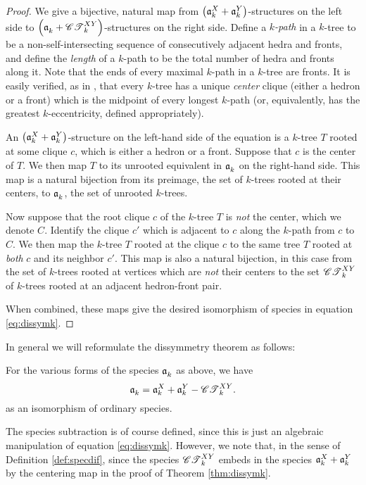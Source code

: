 \documentclass[distribution,draft]{brandiss} %
\numberwithin{section}{chapter}
\numberwithin{figure}{chapter}
\begin{document}
\begin{proof}
  We give a bijective, natural map from $\left( {\mathfrak{a}_{k}^{X} + \mathfrak{a}_{k}^{Y}} \right)$-structures on the left side to $\left( {\mathfrak{a}_{k}^{} + \mathscr{CT}_{k}^{XY}} \right)$-structures on the right side.
  Define a \emph{$k$-path} in a $k$-tree to be a non-self-intersecting sequence of consecutively adjacent hedra and fronts, and define the \emph{length} of a $k$-path to be the total number of hedra and fronts along it.
  Note that the ends of every maximal $k$-path in a $k$-tree are fronts.
  It is easily verified, as in \cite{kob:ktlogspace}, that every $k$-tree has a unique \emph{center} clique (either a hedron or a front) which is the midpoint of every longest $k$-path (or, equivalently, has the greatest $k$-eccentricity, defined appropriately).
  
  An $\left( {\mathfrak{a}_{k}^{X} + \mathfrak{a}_{k}^{Y}} \right)$-structure on the left-hand side of the equation is a $k$-tree $T$ rooted at some clique $c$, which is either a hedron or a front.
  Suppose that $c$ is the center of $T$.
  We then map $T$ to its unrooted equivalent in $\mathfrak{a}_{k}^{}$ on the right-hand side.
  This map is a natural bijection from its preimage, the set of $k$-trees rooted at their centers, to $\mathfrak{a}_{k}^{}$, the set of unrooted $k$-trees.

  Now suppose that the root clique $c$ of the $k$-tree $T$ is \emph{not} the center, which we denote $C$.
  Identify the clique $c'$ which is adjacent to $c$ along the $k$-path from $c$ to $C$.
  We then map the $k$-tree $T$ rooted at the clique $c$ to the same tree $T$ rooted at \emph{both} $c$ and its neighbor $c'$.
  This map is also a natural bijection, in this case from the set of $k$-trees rooted at vertices which are \emph{not} their centers to the set $\mathscr{CT}_{k}^{XY}$ of $k$-trees rooted at an adjacent hedron-front pair.

  When combined, these maps give the desired isomorphism of species in equation \eqref{eq:dissymk}.
\end{proof}

In general we will reformulate the dissymmetry theorem as follows:
\begin{corollary}
  \label{cor:dissymkreform}
  For the various forms of the species $\mathfrak{a}_{k}^{}$ as above, we have
  \begin{equation}
    \label{eq:dissymkreform}
    \mathfrak{a}_{k}^{} = \mathfrak{a}_{k}^{X} + \mathfrak{a}_{k}^{Y} - \mathscr{CT}_{k}^{XY}.
  \end{equation}
  as an isomorphism of ordinary species.
\end{corollary}

The species subtraction is of course defined, since this is just an algebraic manipulation of equation \eqref{eq:dissymk}.
However, we note that, in the sense of Definition \ref{def:specdif}, since the species $\mathscr{CT}_{k}^{XY}$ embeds in the species $\mathfrak{a}_{k}^{X} + \mathfrak{a}_{k}^{Y}$ by the centering map in the proof of Theorem \ref{thm:dissymk}.
\end{document}
